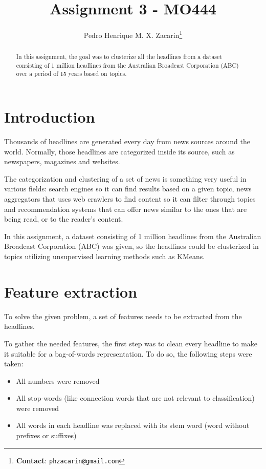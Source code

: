 \documentclass[10pt,twocolumn,letterpaper]{article}
\begin{document}
\title{Assignment 3 - MO444}
\author{Pedro Henrique M. X. Zacarin\thanks{\textbf{Contact}: \tt\small{phzacarin@gmail.com}}\\
}

\maketitle
\begin{abstract}
In this assignment, the goal was to clusterize all the headlines from a dataset consisting of 1 million headlines from the Australian Broadcast Corporation (ABC) over a period of 15 years based on topics.
\end{abstract}

\section{Introduction}
Thousands of headlines are generated every day from news sources around the world. Normally, those headlines are categorized inside its source, such as newspapers, magazines and websites.

The categorization and clustering of a set of news is something very useful in various fields: search engines so it can find results based on a given topic, news aggregators that uses web crawlers to find content so it can filter through topics and recommendation systems that can offer news similar to the ones that are being read, or to the reader's content.

In this assignment, a dataset consisting of 1 million headlines from the Australian Broadcast Corporation (ABC) was given, so the headlines could be clusterized in topics utilizing unsupervised learning methods such as KMeans.

\section{Feature extraction}
To solve the given problem, a set of features needs to be extracted from the headlines.

To gather the needed features, the first step was to clean every headline to make it suitable for a bag-of-words representation. To do so, the following steps were taken:
\begin{itemize}
	\item All numbers were removed
	\item All stop-words (like connection words that are not relevant to classification) were removed
	\item All words in each headline was replaced with its stem word (word without prefixes or suffixes) 
\end{itemize}
\end{document}
